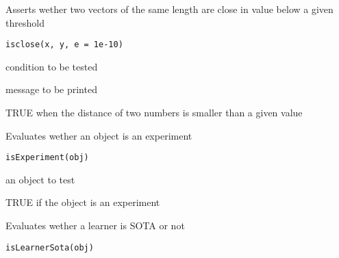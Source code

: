 \documentclass[a4paper]{book}
\begin{document}
%
\begin{Description}
Asserts wether two vectors of the same length are close in value
below a given threshold
\end{Description}
%
\begin{Usage}
\begin{verbatim}
isclose(x, y, e = 1e-10)
\end{verbatim}
\end{Usage}
%
\begin{Arguments}
\begin{ldescription}
\item[\code{x:}] condition to be tested

\item[\code{y:}] message to be printed
\end{ldescription}
\end{Arguments}
%
\begin{Value}
TRUE when the distance of two numbers is smaller than a given value
\end{Value}
%
\begin{Description}
Evaluates wether an object is an experiment
\end{Description}
%
\begin{Usage}
\begin{verbatim}
isExperiment(obj)
\end{verbatim}
\end{Usage}
%
\begin{Arguments}
\begin{ldescription}
\item[\code{obj:}] an object to test
\end{ldescription}
\end{Arguments}
%
\begin{Value}
TRUE if the object is an experiment
\end{Value}
%
\begin{Description}
Evaluates wether a learner is SOTA or not
\end{Description}
%
\begin{Usage}
\begin{verbatim}
isLearnerSota(obj)
\end{verbatim}
\end{Usage}
\end{document}
